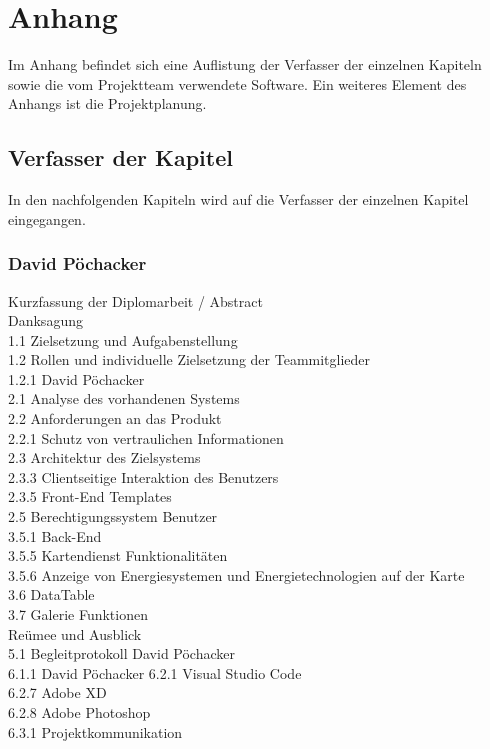 \chapter{Anhang}
Im Anhang befindet sich eine Auflistung der Verfasser der einzelnen Kapiteln sowie die vom Projektteam verwendete Software. Ein weiteres Element des Anhangs ist die Projektplanung.

\section{Verfasser der Kapitel}
In den nachfolgenden Kapiteln wird auf die Verfasser der einzelnen Kapitel eingegangen.
\subsection{David Pöchacker}
Kurzfassung der Diplomarbeit / Abstract \\
Danksagung \\
1.1 Zielsetzung und Aufgabenstellung  \\
1.2 Rollen und individuelle Zielsetzung der Teammitglieder \\
1.2.1 David Pöchacker \\
2.1 Analyse des vorhandenen Systems 	 \\
2.2 Anforderungen an das Produkt	 \\
2.2.1 Schutz von vertraulichen Informationen  \\
2.3 Architektur des Zielsystems  \\
2.3.3 Clientseitige Interaktion des Benutzers  \\
2.3.5  Front-End Templates  \\
2.5 Berechtigungssystem Benutzer  \\
3.5.1 Back-End  \\
3.5.5  Kartendienst Funktionalitäten  \\
3.5.6  Anzeige von Energiesystemen und Energietechnologien auf der Karte  \\
3.6 DataTable  \\
3.7 Galerie Funktionen  \\
Reümee und Ausblick\\
5.1 Begleitprotokoll David Pöchacker	 \\
6.1.1 David Pöchacker
6.2.1 Visual Studio Code  \\
6.2.7 Adobe XD  \\
6.2.8 Adobe Photoshop  \\
6.3.1 Projektkommunikation \\


